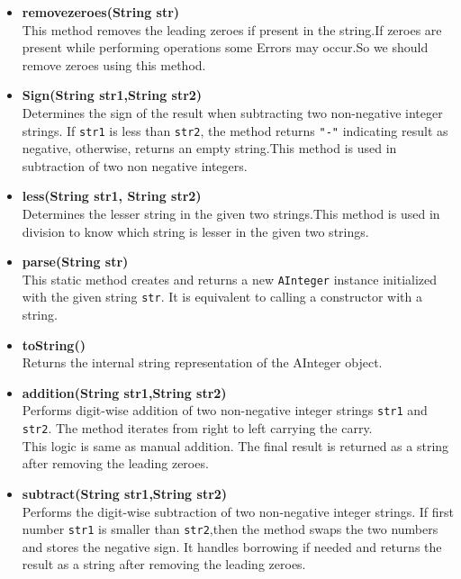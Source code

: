 \documentclass{article}
\begin{document}
\begin{itemize}

    \item \textbf{removezeroes(String str)} \\
    This method removes the leading zeroes if present in the string.If zeroes are present while performing operations some Errors may occur.So we should remove zeroes using this method. 

    \item \textbf{Sign(String str1,String str2)} \\
    Determines the sign of the result when subtracting two non-negative integer strings. If \texttt{str1} is less than \texttt{str2}, the method returns \texttt{"-"} indicating result as negative, otherwise, returns an empty string.This method is used in subtraction of two non negative integers.

    \item \textbf{less(String str1, String str2)} \\
    Determines the lesser string in the given two strings.This method is used in division to know which string is lesser in the given two strings.
    
    \item \textbf{parse(String str)} \\
    This static method creates and returns a new \texttt{AInteger} instance initialized with the given string \texttt{str}.
    It is equivalent to calling a constructor with a string.

    \item \textbf{toString()} \\
    Returns the internal string representation of the AInteger object.

    \item \textbf{addition(String str1,String str2)}\\
    Performs digit-wise addition of two non-negative integer strings \texttt{str1} and \texttt{str2}. The method iterates from right to left carrying the carry.\\This logic is same as manual addition. The final result is returned as a string after removing the leading zeroes.

    \item \textbf{subtract(String str1,String str2)} \\
    Performs the digit-wise subtraction of two non-negative integer strings. If first number \texttt{str1} is smaller than \texttt{str2},then the method swaps the two numbers and stores the negative sign. It handles borrowing if needed and returns the result as a string after removing the leading zeroes.


\end{itemize}
\end{document}
